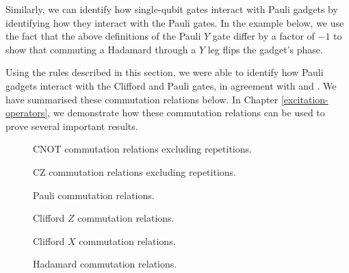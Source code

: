 
Similarly, we can identify how single-qubit gates interact with Pauli gadgets by identifying how they interact with the Pauli gates. In the example below, we use the fact that the above definitions of the Pauli $Y$ gate differ by a factor of $-1$ to show that commuting a Hadamard through a $Y$ leg flips the gadget's phase.


Using the rules described in this section, we were able to identify how Pauli gadgets interact with the Clifford and Pauli gates, in agreement with \cite{Yeung2020} and \cite{Cowtan2019}. We have summarised these commutation relations below. In Chapter \ref{excitation-operators}, we demonstrate how these commutation relations can be used to prove several important results.

\begin{figure}[H]
    \centering
    \caption{CNOT commutation relations excluding repetitions.}
    \label{cnot-commutations}
\end{figure}

\begin{figure}[H]
    \centering
    \caption{CZ commutation relations excluding repetitions.}
    \label{cz-commutations}
\end{figure}

\begin{figure}[H]
    \centering
    \caption{Pauli commutation relations.}
    \label{pauli-commutations}
\end{figure}

\begin{figure}[H]
    \centering
    \caption{Clifford $Z$ commutation relations.}
    \label{clifford-z-commutations}
\end{figure}

\begin{figure}[H]
    \centering
    \caption{Clifford $X$ commutation relations.}
    \label{clifford-x-commutations}
\end{figure}

\begin{figure}[H]
    \centering
    \caption{Hadamard commutation relations.}
    \label{clifford-h-commutations}
\end{figure}

